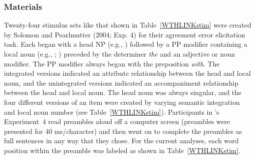 \documentclass[12pt,titlepage]{article}
\begin{document}
\subsubsection{Materials} Twenty-four stimulus sets like that shown in Table~\ref{WTHLINKstim} were created by Solomon and Pearlmutter (2004; Exp. 4) for their agreement error elicitation task.  Each began with a head NP (e.g., ) followed by a PP modifier containing a local noun (e.g., ; ) preceded by the determiner \textit{the} and an adjective or noun modifier.  The PP modifier always began with the preposition \textit{with}. The integrated versions indicated an attribute relationship between the head and local noun, and the unintegrated versions indicated an accompaniment relationship between the head and local noun. The head noun
was always singular, and the four different versions of an item were
created by varying semantic integration and local noun number (see Table~\ref{WTHLINKstim}). Participants in \citeauthor{SolomonPearlmutter04}'s \citeyear{SolomonPearlmutter04} Experiment~4 read preambles aloud off a computer screen (preambles were presented for 40 ms/character) and then went on to complete the preambles as full sentences in any way that they chose.  For the current analyses, each word position within the preamble was labeled as shown in  Table~\ref{WTHLINKstim}. 
\end{document}
